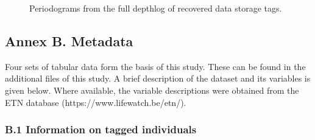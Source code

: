 \documentclass[
  authoryear,
  review,
  3p]{elsarticle}
\begin{document}
\begin{figure}

\begin{minipage}[t]{\linewidth}

{\centering 


}

\end{minipage}%
\newline
\begin{minipage}[t]{\linewidth}

{\centering 


}

\end{minipage}%

\caption{\label{fig-fft}Periodograms from the full depthlog of recovered
data storage tags.}

\end{figure}

\hypertarget{annex-b.-metadata}{%
\subsection*{\texorpdfstring{\textbf{Annex B.}
Metadata}{Annex B. Metadata}}\label{annex-b.-metadata}}

Four sets of tabular data form the basis of this study. These can be
found in the additional files of this study. A brief description of the
dataset and its variables is given below. Where available, the variable
descriptions were obtained from the ETN database
(https://www.lifewatch.be/etn/).

\hypertarget{b.1-information-on-tagged-individuals}{%
\subsubsection*{\texorpdfstring{\textbf{B.1} Information on tagged
individuals}{B.1 Information on tagged individuals}}\label{b.1-information-on-tagged-individuals}}
\end{document}
